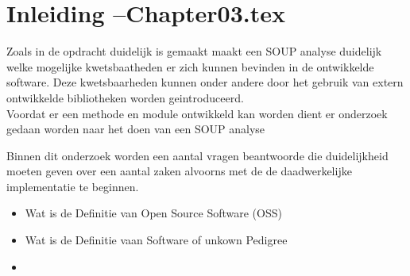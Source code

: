 
\chapter{Inleiding --Chapter03.tex} %

\label{inOnderzoek} %

Zoals in de opdracht duidelijk is gemaakt maakt een SOUP analyse duidelijk welke mogelijke kwetsbaatheden er zich kunnen bevinden in de ontwikkelde software. Deze kwetsbaarheden kunnen onder andere door het gebruik van extern ontwikkelde bibliotheken worden geintroduceerd. \\
Voordat er een methode en module ontwikkeld kan worden dient er onderzoek gedaan worden naar het doen van een SOUP analyse

Binnen dit onderzoek worden een aantal vragen beantwoorde die duidelijkheid moeten geven over een aantal zaken alvoorns met de de daadwerkelijke implementatie te beginnen.


\begin{itemize}
\item Wat is de Definitie van Open Source Software (OSS)
\item Wat is de Definitie vaan Software of unkown Pedigree
\item

\end{itemize}


